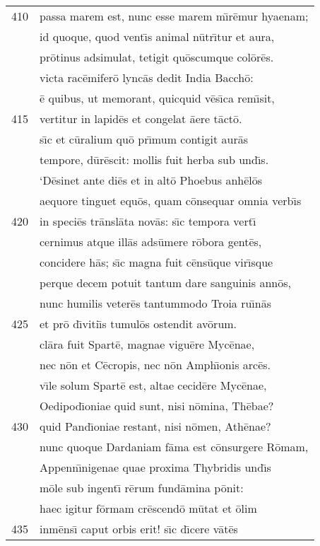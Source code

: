 \documentclass[paper=6in:9in,pagesize=pdftex,
               headinclude=on,footinclude=on,12pt]{scrbook}
\begin{document}
\begin{longtable}[p]{ r l }
410 & passa marem est, nunc esse marem m\={\i}r\=emur hyaenam;\\ 
 & id quoque, quod vent\={\i}s animal n\=utr\={\i}tur et aura,\\ 
 & pr\=otinus adsimulat, tetigit qu\=oscumque col\=or\=es.\\ 
 & victa rac\=emifer\=o lync\=as dedit India Bacch\=o:\\ 
 & \=e quibus, ut memorant, quicquid v\=es\={\i}ca rem\={\i}sit,\\ 
415 & vertitur in lapid\=es et congelat \=aere t\=act\=o.\\ 
 & s\={\i}c et c\=uralium qu\=o pr\={\i}mum contigit aur\=as\\ 
 & tempore, d\=ur\=escit: mollis fuit herba sub und\={\i}s.\\ 
 & \indent `D\=esinet ante di\=es et in alt\=o Phoebus anh\=el\=os\\ 
 & aequore tinguet equ\=os, quam c\=onsequar omnia verb\={\i}s\\ 
420 & in speci\=es tr\=ansl\=ata nov\=as: s\={\i}c tempora vert\={\i}\\ 
 & cernimus atque ill\=as ads\=umere r\=obora gent\=es,\\ 
 & concidere h\=as; s\={\i}c magna fuit c\=ens\=uque vir\={\i}sque\\ 
 & perque decem potuit tantum dare sanguinis ann\=os,\\ 
 & nunc humilis veter\=es tantummodo Troia ru\={\i}n\=as\\ 
425 & et pr\=o d\={\i}viti\={\i}s tumul\=os ostendit av\=orum.\\ 
 & cl\=ara fuit Spart\=e, magnae vigu\=ere Myc\=enae,\\ 
 & nec n\=on et C\=ecropis, nec n\=on Amph\={\i}onis arc\=es.\\ 
 & v\={\i}le solum Spart\=e est, altae cecid\=ere Myc\=enae,\\ 
 & Oedipod\={\i}oniae quid sunt, nisi n\=omina, Th\=ebae?\\ 
430 & quid Pand\={\i}oniae restant, nisi n\=omen, Ath\=enae?\\ 
 & nunc quoque Dardaniam f\=ama est c\=onsurgere R\=omam,\\ 
 & Appenn\={\i}nigenae quae proxima Thybridis und\={\i}s\\ 
 & m\=ole sub ingent\={\i} r\=erum fund\=amina p\=onit:\\ 
 & haec igitur f\=ormam cr\=escend\=o m\=utat et \=olim\\ 
435 & inm\=ens\={\i} caput orbis erit! s\={\i}c d\={\i}cere v\=at\=es\\ 

\end{longtable}
\end{document}
